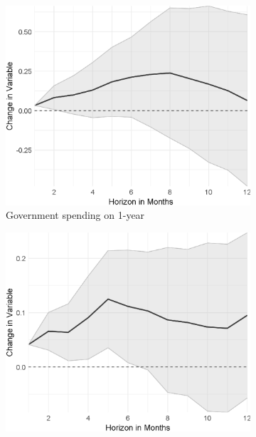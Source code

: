 
\begin{figure}[H]
	\centering
	\captionsetup{font=footnotesize}
	\begin{subfigure}{00.32\textwidth}
	\includegraphics[width=1\textwidth]{output/lp/baseline/level/government_spending/government_spendingonexpectations1y_djn.eps}
	\caption{Government spending on 1-year}
\end{subfigure}
\begin{subfigure}{00.32\textwidth}
	\includegraphics[width=1\textwidth]{output/lp/baseline/level/monetary_policy/monetary_policyonexpectations3y_djn.eps}

\end{subfigure}
\end{figure}
